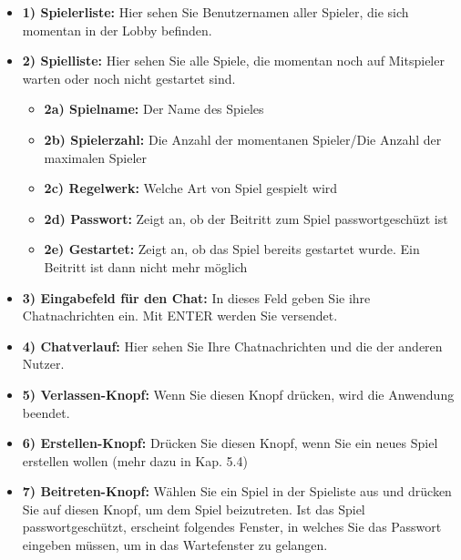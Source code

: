\documentclass[titlepage,10pt,a4paper]{article}
\begin{document}
\begin{itemize}
	\item \textbf{1) Spielerliste:} Hier sehen Sie Benutzernamen aller Spieler, die sich momentan in der \gls{Lobby}  befinden.
	\item \textbf{2) Spielliste:} Hier sehen Sie alle Spiele, die momentan noch auf Mitspieler warten oder noch nicht gestartet sind.
	\begin{itemize}
		\item \textbf{2a) Spielname:} Der Name des Spieles
		\item \textbf{2b) Spielerzahl:} Die Anzahl der momentanen Spieler/Die Anzahl der maximalen Spieler
		\item \textbf{2c) Regelwerk:} Welche Art von Spiel gespielt wird
		\item \textbf{2d) Passwort:} Zeigt an, ob der Beitritt zum Spiel passwortgeschüzt ist
		\item \textbf{2e) Gestartet:} Zeigt an, ob das Spiel bereits gestartet wurde. Ein Beitritt ist dann nicht mehr möglich
	\end{itemize}
	\item \textbf{3) Eingabefeld für den Chat:} In dieses Feld geben Sie ihre Chatnachrichten ein. Mit ENTER werden Sie versendet.
	\item \textbf{4) Chatverlauf:} Hier sehen Sie Ihre Chatnachrichten und die der anderen Nutzer.
	\item \textbf{5) Verlassen-Knopf:} Wenn Sie diesen Knopf drücken, wird die Anwendung beendet.
	\item \textbf{6) Erstellen-Knopf:} Drücken Sie diesen Knopf, wenn Sie ein neues Spiel erstellen wollen (mehr dazu in Kap. 5.4)
	\item \textbf{7) Beitreten-Knopf:} Wählen Sie ein Spiel in der Spieliste aus und drücken Sie auf diesen Knopf, um dem Spiel beizutreten. Ist das Spiel passwortgeschützt, erscheint folgendes Fenster, in welches Sie das Passwort eingeben müssen, um in das \gls{Wartefenster} zu gelangen.


\end{itemize}
\end{document}
